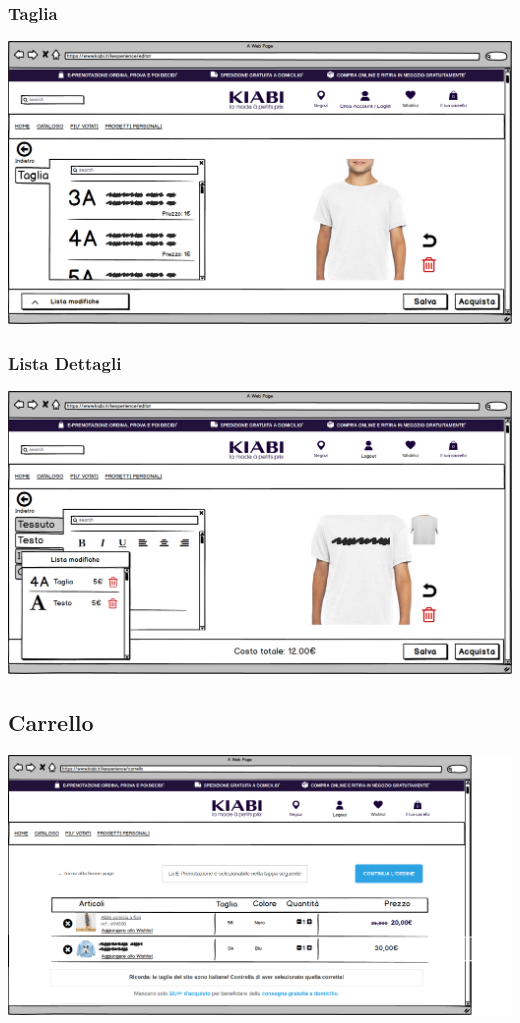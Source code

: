 \documentclass[12pt,italian,]{report}
\begin{document}
\subsubsection{Taglia} 
\includegraphics{balsamiq/Editor - caratteristica capo taglia.png}


\subsubsection{Lista Dettagli} 
\includegraphics{balsamiq/Editor - caratteristica busto testo 4.png}


\subsection{Carrello} 
\includegraphics{balsamiq/Carrello.png}
\end{document}
